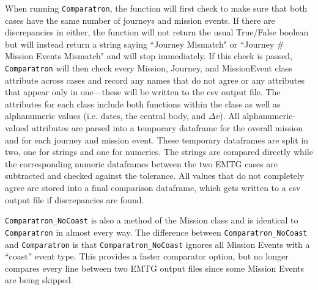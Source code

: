 When running \texttt{Comparatron}, the function will first check to make sure that both cases have the same number of journeys and mission events. If there are discrepancies in either, the function will not return the usual True/False boolean but will instead return a string saying ``Journey Mismatch" or ``Journey \# Mission Events Mismatch" and will stop immediately. If this check is passed, \texttt{Comparatron} will then check every Mission, Journey, and MissionEvent class attribute across cases and record any names that do not agree or any attributes that appear only in one---these will be written to the csv output file. The attributes for each class include both functions within the class as well as alphanumeric values (i.e. dates, the central body, and $\Delta v$). All alphanumeric-valued attributes are parsed into a temporary dataframe for the overall mission and for each journey and mission event. These temporary dataframes are split in two, one for strings and one for numerics. The strings are compared directly while the corresponding numeric dataframes between the two \ac{EMTG} cases are subtracted and checked against the tolerance. All values that do not completely agree are stored into a final comparison dataframe, which gets written to a csv output file if discrepancies are found.

\texttt{Comparatron\_NoCoast} is also a method of the Mission class and is identical to \texttt{Comparatron} in almost every way. The difference between \texttt{Comparatron\_NoCoast} and \texttt{Comparatron} is that \texttt{Comparatron\_NoCoast} ignores all Mission Events with a ``coast'' event type. This provides a faster comparator option, but no longer compares every line between two \ac{EMTG} output files since some Mission Events are being skipped.